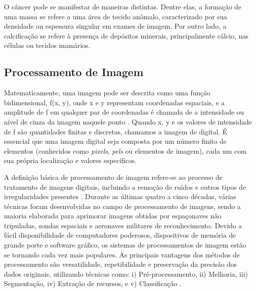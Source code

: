 O câncer pode se manifestar de maneiras distintas. Dentre elas, a formação de uma massa se refere a uma área de tecido anômalo, caracterizado por sua densidade ou espessura singular em exames de imagem. Por outro lado, a calcificação se refere à presença de depósitos minerais, principalmente cálcio, nas células ou tecidos mamários.





\subsection{\esp Processamento de Imagem} \label{procesamentoimg}

Matematicamente, uma imagem pode ser descrita como uma função bidimensional, f(x, y), onde x e y representam coordenadas espaciais, e a amplitude de f em qualquer par de coordenadas é chamada de a intensidade ou nível de cinza da imagem naquele ponto \cite{techniques}. Quando x, y e os valores de intensidade de f são quantidades finitas e discretas, chamamos a imagem de digital. É essencial que uma imagem digital seja composta por um número finito de elementos (conhecidos como \textit{pixels}, \textit{pels} ou elementos de imagem), cada um com sua própria localização e valores específicos. 

A definição básica de processamento de imagem refere-se ao processo de tratamento de imagens digitais, incluindo a remoção de ruídos e outros tipos de irregularidades presentes \cite{histopathological}. Durante as últimas quatro a cinco décadas, várias técnicas foram desenvolvidas no campo de processamento de imagens, sendo a maioria elaborada para aprimorar imagens obtidas por espaçonaves não tripuladas, sondas espaciais e aeronaves militares de reconhecimento. Devido a fácil disponibilidade de computadores poderosos, dispositivos de memória de grande porte e software gráfico, os sistemas de processamentos de imagem estão se tornando cada vez mais populares. As principais vantagens dos métodos de processamento são versatilidade, repetibilidade e preservação da precisão dos dados originais, utilizando técnicas como: i) Pré-processamento, ii) Melhoria, iii) Segmentação, iv) Extração de recursos, e v) Classificação \cite{lungcancer}.

